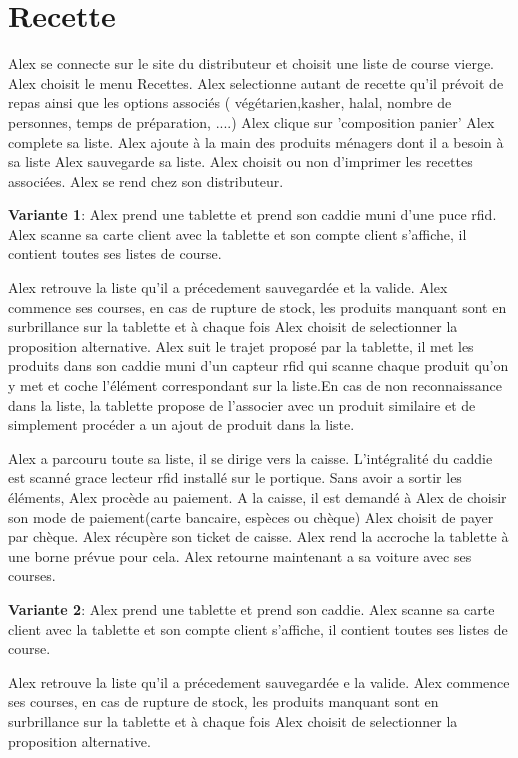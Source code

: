 \section{Recette}

Alex se connecte sur le site du distributeur et choisit une liste de course vierge.
Alex choisit le menu Recettes.
Alex selectionne autant de recette qu'il prévoit de repas ainsi que les options associés ( végétarien,kasher, halal, nombre de personnes, temps de préparation, ....)
Alex clique sur 'composition panier'
Alex complete sa liste.
Alex ajoute à la main des produits ménagers dont il a besoin à sa liste
Alex sauvegarde sa liste.
Alex choisit ou non d'imprimer les recettes associées.
Alex se rend chez son distributeur.
\startitemize
\item {\bf Variante 1}:
Alex prend une tablette et prend son caddie muni d'une puce rfid.
Alex scanne sa carte client avec la tablette et son compte client s'affiche, il contient toutes ses listes de course.
\par
Alex retrouve la liste qu'il a précedement sauvegardée et la valide.
Alex commence ses courses, en cas de rupture de stock, les produits manquant sont en surbrillance sur la tablette et à chaque fois Alex choisit de selectionner la proposition alternative.
Alex suit le trajet proposé par la tablette, il met les produits dans son caddie muni d'un capteur rfid qui scanne chaque produit qu'on y met et coche l'élément correspondant sur la liste.En cas de non reconnaissance dans la liste, la tablette propose de l'associer avec un produit similaire et de simplement procéder a un ajout de produit dans la liste.
\par

Alex a parcouru toute sa liste, il se dirige vers la caisse. 
L'intégralité du caddie est scanné grace lecteur rfid installé sur le portique.
Sans avoir a sortir les éléments, Alex procède au paiement.
A la caisse, il est demandé à Alex de choisir son mode de paiement(carte bancaire, espèces ou chèque)
Alex choisit de payer par chèque. 
Alex récupère son ticket de caisse. 
Alex rend la accroche la tablette à une borne prévue pour cela.  
Alex retourne maintenant a sa voiture avec ses courses.

\item {\bf Variante 2}:
Alex prend une tablette et prend son caddie.
Alex scanne sa carte client avec la tablette et son compte client s'affiche, il contient toutes ses listes de course. 
\par
Alex retrouve la liste qu'il a précedement sauvegardée e la valide.
Alex commence ses courses, en cas de rupture de stock, les produits manquant sont en surbrillance sur la tablette et à chaque fois Alex choisit de selectionner la proposition alternative.
\par

